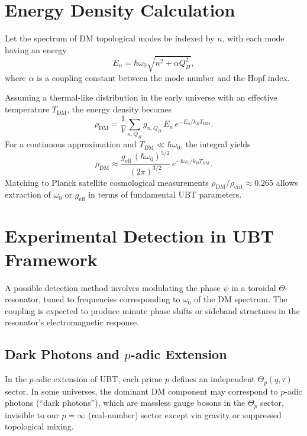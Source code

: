 \section{Energy Density Calculation}
Let the spectrum of DM topological modes be indexed by $n$, with each mode having an energy
\begin{equation}
E_n = \hbar \omega_0 \sqrt{n^2 + \alpha Q_H^2},
\end{equation}
where $\alpha$ is a coupling constant between the mode number and the Hopf index.

Assuming a thermal-like distribution in the early universe with an effective temperature $T_{\mathrm{DM}}$, the energy density becomes
\begin{equation}
\rho_{\mathrm{DM}} = \frac{1}{V} \sum_{n,Q_H} g_{n,Q_H} \, E_n \, e^{-E_n/k_B T_{\mathrm{DM}}}.
\end{equation}
For a continuous approximation and $T_{\mathrm{DM}} \ll \hbar\omega_0$, the integral yields
\begin{equation}
\rho_{\mathrm{DM}} \approx \frac{g_{\mathrm{eff}} \, (\hbar\omega_0)^{5/2}}{(2\pi)^{3/2}} \, e^{-\hbar\omega_0/k_B T_{\mathrm{DM}}}.
\end{equation}
Matching to Planck satellite cosmological measurements $\rho_{\mathrm{DM}}/\rho_{\mathrm{crit}} \approx 0.265$ allows extraction of $\omega_0$ or $g_{\mathrm{eff}}$ in terms of fundamental UBT parameters.

\section{Experimental Detection in UBT Framework}
A possible detection method involves modulating the phase $\psi$ in a toroidal $\Theta$-resonator, tuned to frequencies corresponding to $\omega_0$ of the DM spectrum. The coupling is expected to produce minute phase shifts or sideband structures in the resonator's electromagnetic response.

\subsection{Dark Photons and $p$-adic Extension}
In the $p$-adic extension of UBT, each prime $p$ defines an independent $\Theta_p(q,\tau)$ sector. In some universes, the dominant DM component may correspond to $p$-adic photons (``dark photons''), which are massless gauge bosons in the $\Theta_p$ sector, invisible to our $p= \infty$ (real-number) sector except via gravity or suppressed topological mixing.

